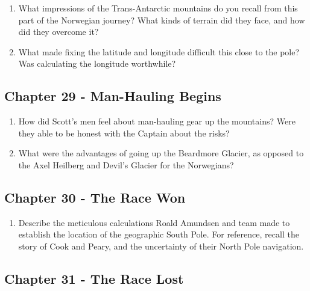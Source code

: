 \documentclass[10pt]{article}
\begin{document}
\begin{enumerate}
\item What impressions of the Trans-Antarctic mountains do you recall from this part of the Norwegian journey?  What kinds of terrain did they face, and how did they overcome it? \\ \vspace{1.5cm}
\item What made fixing the latitude and longitude difficult this close to the pole?  Was calculating the longitude worthwhile? \\ \vspace{1.5cm}
\end{enumerate}

\subsection{Chapter 29 - Man-Hauling Begins}

\begin{enumerate}
\item How did Scott's men feel about man-hauling gear up the mountains?  Were they able to be honest with the Captain about the risks? \\ \vspace{1.5cm}
\item What were the advantages of going up the Beardmore Glacier, as opposed to the Axel Heilberg and Devil's Glacier for the Norwegians? \\ \vspace{1.5cm}
\end{enumerate}

\subsection{Chapter 30 - The Race Won}

\begin{enumerate}
\item Describe the meticulous calculations Roald Amundsen and team made to establish the location of the geographic South Pole.  For reference, recall the story of Cook and Peary, and the uncertainty of their North Pole navigation. \\ \vspace{1.5cm}
\end{enumerate}

\subsection{Chapter 31 - The Race Lost}
\end{document}
